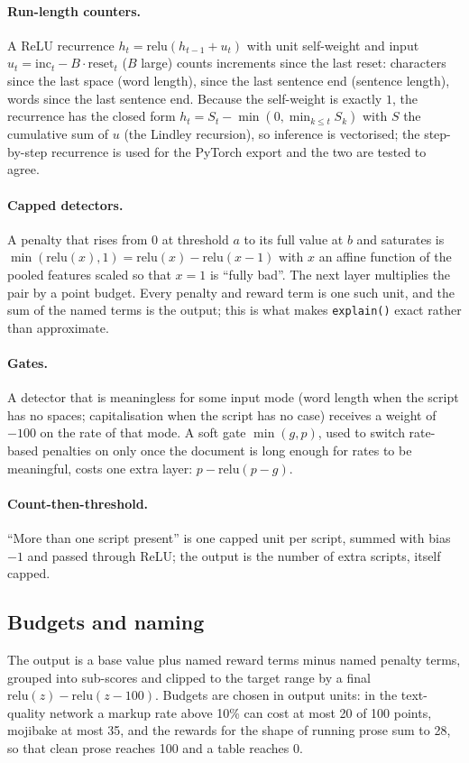 \paragraph{Run-length counters.} A ReLU recurrence
$h_t=\mathrm{relu}(h_{t-1}+u_t)$ with unit self-weight and input
$u_t = \text{inc}_t - B\cdot\text{reset}_t$ ($B$ large) counts increments since
the last reset: characters since the last space (word length), since the last
sentence end (sentence length), words since the last sentence end. Because the
self-weight is exactly $1$, the recurrence has the closed form
$h_t = S_t - \min(0,\min_{k\le t} S_k)$ with $S$ the cumulative sum of $u$
(the Lindley recursion), so inference is vectorised; the step-by-step
recurrence is used for the PyTorch export and the two are tested to agree.

\paragraph{Capped detectors.}\label{sec:method-capped} A penalty that rises from $0$ at threshold $a$
to its full value at $b$ and saturates is $\min(\mathrm{relu}(x),1) =
\mathrm{relu}(x) - \mathrm{relu}(x-1)$ with $x$ an affine function of the
pooled features scaled so that $x=1$ is ``fully bad''. The next layer multiplies
the pair by a point budget. Every penalty and reward term is one such unit, and
the sum of the named terms is the output; this is what makes
\texttt{explain()} exact rather than approximate.

\paragraph{Gates.} A detector that is meaningless for some input mode (word
length when the script has no spaces; capitalisation when the script has no
case) receives a weight of $-100$ on the rate of that mode. A soft gate
$\min(g,p)$, used to switch rate-based penalties on only once the document is
long enough for rates to be meaningful, costs one extra layer:
$p - \mathrm{relu}(p-g)$.

\paragraph{Count-then-threshold.} ``More than one script present'' is one
capped unit per script, summed with bias $-1$ and passed through ReLU; the
output is the number of extra scripts, itself capped.

\subsection{Budgets and naming}
The output is a base value plus named reward terms minus named penalty terms,
grouped into sub-scores and clipped to the target range by a final
$\mathrm{relu}(z)-\mathrm{relu}(z-100)$. Budgets are chosen in output units:
in the text-quality network a markup rate above 10\% can cost at most 20 of 100
points, mojibake at most 35, and the rewards for the shape of running prose sum
to 28, so that clean prose reaches 100 and a table reaches 0.

